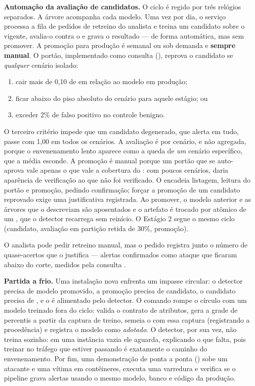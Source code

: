 \textbf{Automação da avaliação de candidatos.} O ciclo é regido por três relógios
separados. A árvore  acompanha cada modelo. Uma vez por dia, o
serviço  processa a fila de pedidos de retreino do analista e treina
um candidato sobre o  vigente, avalia-o contra o  e grava o
resultado --- de forma automática, mas sem promover. A promoção para produção é
semanal ou sob demanda e \textbf{sempre manual}. O portão, implementado como
consulta (), reprova o candidato se \emph{qualquer} cenário
isolado:

\begin{enumerate}
  \item cair mais de 0,10 de  em relação ao modelo em produção;
  \item ficar abaixo do piso absoluto do cenário para aquele estágio; ou
  \item exceder 2\% de falso positivo no controle benigno.
\end{enumerate}

O terceiro critério impede que um candidato degenerado, que alerta em tudo, passe
com  1,00 em todos os cenários. A avaliação é por cenário, e não
agregada, porque o envenenamento lento aparece como a queda de \emph{um} cenário
específico, que a média esconde. A promoção é manual porque um portão que se
auto-aprova vale apenas o que vale a cobertura do : com poucos
cenários, daria aparência de verificação ao que não foi verificado. O
 encadeia listagem, leitura do portão e promoção, pedindo
confirmação; forçar a promoção de um candidato reprovado exige uma justificativa
registrada. Ao promover, o modelo anterior e as árvores que o descreviam são
aposentados e o artefato é trocado por  atômico de um ,
que o detector recarrega sem reinício. O Estágio 2 segue o mesmo ciclo
(candidato, avaliação em partição retida de 30\%, promoção).

O analista pode pedir retreino manual, mas o pedido registra junto o número de
quase-acertos que o justifica --- alertas confirmados como ataque que ficaram
abaixo do corte, medidos pela consulta .

\textbf{Partida a frio.} Uma instalação nova enfrenta um impasse circular: o
detector precisa de modelo promovido, a promoção precisa de candidato, o candidato
precisa de , e o  é alimentado pelo detector. O comando
 rompe o círculo com um modelo treinado fora do ciclo: valida o contrato
de atributos, gera a grade de percentis a partir da captura de treino, semeia o
 com essa captura (registrando a procedência) e registra o modelo como
\emph{adotado}. O detector, por sua vez, não treina sozinho: em uma instância vazia
ele aguarda, explicando o que falta, pois treinar no tráfego que estiver passando é
exatamente o caminho do envenenamento. Por fim, uma demonstração de ponta a ponta
() sobe um atacante e uma vítima em contêineres,
executa uma varredura  e verifica se o pipeline grava alertas usando o
mesmo modelo, banco e código da produção.
